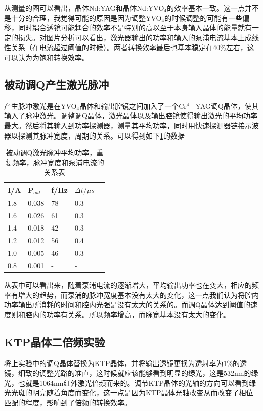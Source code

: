 \documentclass[aps,pre,12pt,preprint,onecolumn,showpacs,showkeys,UTF8]{revtex4-1}
\begin{document}
从测量的图可以看出，晶体Nd:YAG和晶体Nd:YVO$_4$的效率基本一致。这一点并不是十分的合理，我觉得可能的原因是因为调整YVO$_4$的时候调整的可能有一些偏移，同时耦合透镜可能耦合的效率不是特别的高以至于本身输入晶体的能量就有一定的损失。对图片分析可以看出，激光器输出的功率和输入的泵浦电流基本上成线性关系（在电流超过阈值的时候）。两者转换效率最后也基本稳定在40\%左右，这可以认为为饱和转换效率。
\subsection{被动调Q产生激光脉冲}

产生脉冲激光是在YVO$_4$晶体和输出腔镜之间加入了一个Cr$^{4+}$YAG调Q晶体，使其输入了脉冲激光。调整调Q晶体，激光晶体以及输出腔镜使得输出激光的平均功率最大。然后将其输入到功率探测器，测量其平均功率，同时用快速探测器链接示波器以探测其脉冲宽度，周期的关系。可以得到如下\ref{t:1}的数据
\begin{center}
	\begin{table}
		\caption{被动调Q激光脉冲平均功率，重复频率，脉冲宽度和泵浦电流的关系表}
		\label{t:1}
		\begin{tabular}{m{3cm}<{\centering}m{3cm}<{\centering}m{3cm}<{\centering}m{3cm}<{\centering}m{3cm}}

			\hline
			\hline
			I/A&P$_{out}$&f/Hz&$\Delta t/\mu s$\\
			\hline
			1.8&0.038&78&0.3\\
			1.6&0.026&61&0.3\\
			1.4&0.018&42&0.3\\
			1.2&0.012&56&0.4\\
			1.0&0.005&46&0.3\\
			0.8&0.001&-&-\\
			\hline
		\end{tabular}
	\end{table}
\end{center}

从表中可以看出来，随着泵浦电流的逐渐增大，平均输出功率也在变大，相应的频率有增大的趋势，而泵浦的脉冲宽度基本没有太大的变化，这一点我们认为将腔内功率输出所消耗的时间和腔内光强是没有太大的关系的。而调Q晶体达到阈值的速度则和腔内的功率有关系。所以频率增高，而脉宽基本没有太大的变化。

\subsection{KTP晶体二倍频实验}

将上实验中的调Q晶体替换为KTP晶体，并将输出透镜更换为透射率为1\%的透镜，细致的调整光路的准直，这时候就应该能够看到明显的绿光，这是532nm的绿光，也就是1064nm红外激光倍频而来的。调节KTP晶体的光轴的方向可以看到绿光光斑的明亮随着角度而变化，这一点是因为KTP晶体光轴改变从而改变了相位匹配的程度，影响到了倍频的转换效率。
\end{document}
